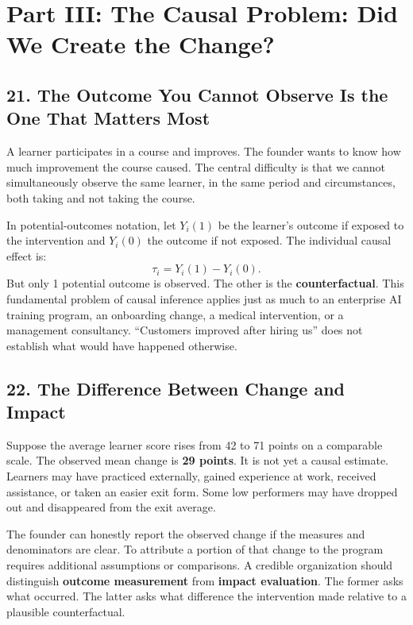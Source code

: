 \section*{Part III: The Causal Problem: Did We Create the Change?}

\subsection*{21. The Outcome You Cannot Observe Is the One That Matters Most}

A learner participates in a course and improves. The founder wants to know how much improvement the course caused. The central difficulty is that we cannot simultaneously observe the same learner, in the same period and circumstances, both taking and not taking the course.

In potential-outcomes notation, let $Y_i(1)$ be the learner's outcome if exposed to the intervention and $Y_i(0)$ the outcome if not exposed. The individual causal effect is:
\begin{equation}
\tau_i = Y_i(1) - Y_i(0).
\end{equation}
But only 1 potential outcome is observed. The other is the \textbf{counterfactual}. This fundamental problem of causal inference applies just as much to an enterprise AI training program, an onboarding change, a medical intervention, or a management consultancy. ``Customers improved after hiring us'' does not establish what would have happened otherwise.

\subsection*{22. The Difference Between Change and Impact}

Suppose the average learner score rises from 42 to 71 points on a comparable scale. The observed mean change is \textbf{29 points}. It is not yet a causal estimate. Learners may have practiced externally, gained experience at work, received assistance, or taken an easier exit form. Some low performers may have dropped out and disappeared from the exit average.

The founder can honestly report the observed change if the measures and denominators are clear. To attribute a portion of that change to the program requires additional assumptions or comparisons. A credible organization should distinguish \textbf{outcome measurement} from \textbf{impact evaluation}. The former asks what occurred. The latter asks what difference the intervention made relative to a plausible counterfactual.

